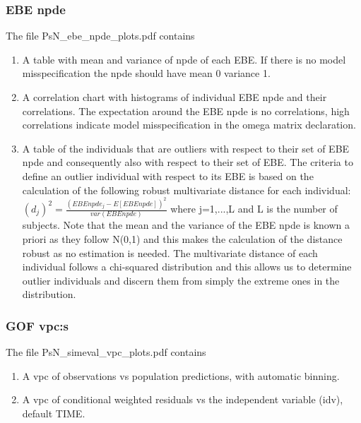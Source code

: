 \subsubsection{EBE npde}
\noindent The file PsN\_ebe\_npde\_plots.pdf contains
\begin{enumerate}
\item A table with mean and variance of npde of each EBE. If there is no model misspecification the npde should have mean 0 variance 1.
\item A correlation chart with histograms of individual EBE npde and their correlations. The expectation around the EBE npde is no correlations, high correlations indicate model misspecification in the omega matrix declaration.
\item A table of the individuals that are outliers with respect to their set of EBE npde and consequently also with respect to their set of EBE. The criteria to define an outlier individual with respect to its EBE is based on the calculation of the following robust multivariate distance for each individual:
$(d_{j})^2=\frac{(EBEnpde_{j} - E[EBEnpde])^2}{var(EBEnpde)}$
where j=1,...,L and L is the number of subjects. Note that the mean and the variance of the EBE npde is known a priori as they follow N(0,1) and this makes the calculation of the distance robust as no estimation is needed. The multivariate distance of each individual follows a chi-squared distribution and this allows us to determine outlier individuals and discern them from simply the extreme ones in the distribution.
\end{enumerate}

\subsubsection{GOF vpc:s}
\noindent The file PsN\_simeval\_vpc\_plots.pdf contains
\begin{enumerate}
\item A vpc of observations vs population predictions, with automatic binning.
\item A vpc of conditional weighted residuals vs the independent variable (idv), default TIME.
\end{enumerate}


